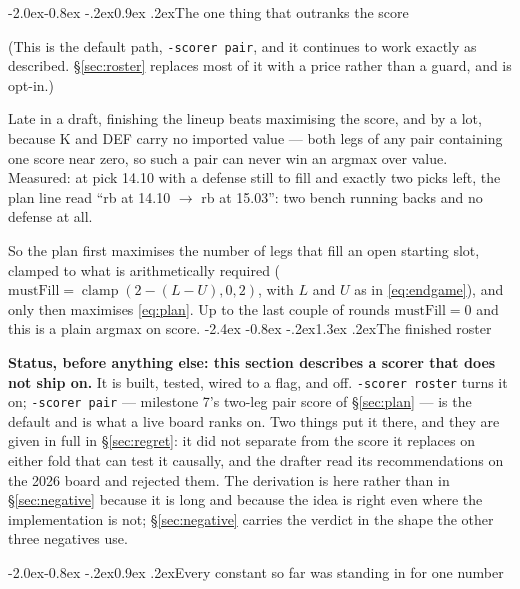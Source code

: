 \documentclass[10pt,a4paper]{article}
\makeatletter
\theoremstyle{plain}
\theoremstyle{definition}
\theoremstyle{remark}
\newcommand{\code}[1]{\texttt{\small #1}}
\renewcommand\section{\@startsection{section}{1}{\z@}%
  {-2.4ex \@plus -0.8ex \@minus -.2ex}{1.3ex \@plus.2ex}{\normalfont\Large\bfseries}}
\renewcommand\subsection{\@startsection{subsection}{2}{\z@}%
  {-2.0ex\@plus -0.8ex \@minus -.2ex}{0.9ex \@plus .2ex}{\normalfont\large\bfseries}}
\makeatother
\begin{document}
\subsection{The one thing that outranks the score}

(This is the default path, \code{-scorer pair}, and it continues to work exactly as
described. \S\ref{sec:roster} replaces most of it with a price rather than a guard, and is
opt-in.)

Late in a draft, finishing the lineup beats maximising the score, and by a lot, because
K and DEF carry no imported value --- both legs of any pair containing one score near
zero, so such a pair can never win an argmax over value. Measured: at pick 14.10 with a
defense still to fill and exactly two picks left, the plan line read ``rb at 14.10
$\to$ rb at 15.03'': two bench running backs and no defense at all.

So the plan first maximises the number of legs that fill an open starting slot, clamped
to what is arithmetically required ($\mathrm{mustFill} = \operatorname{clamp}(2 - (L - U),
0, 2)$, with $L$ and $U$ as in \eqref{eq:endgame}), and only then maximises
\eqref{eq:plan}. Up to the last couple of rounds $\mathrm{mustFill} = 0$ and this is a
plain argmax on score.
\section{The finished roster}
\label{sec:roster}

\textbf{Status, before anything else: this section describes a scorer that does not ship
on.} It is built, tested, wired to a flag, and off. \code{-scorer roster} turns it on;
\code{-scorer pair} --- milestone 7's two-leg pair score of \S\ref{sec:plan} --- is the
default and is what a live board ranks on. Two things put it there, and they are given in
full in \S\ref{sec:regret}: it did not separate from the score it replaces on either fold
that can test it causally, and the drafter read its recommendations on the 2026 board and
rejected them. The derivation is here rather than in \S\ref{sec:negative} because it is
long and because the idea is right even where the implementation is not; \S\ref{sec:negative}
carries the verdict in the shape the other three negatives use.

\subsection{Every constant so far was standing in for one number}
\end{document}
